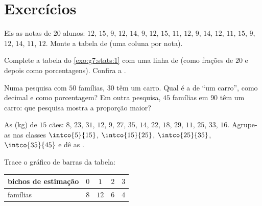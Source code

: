 \section{Exercícios}

\begin{exercise}[$\star$]\label{exo:g7:stats:1}
Eis as notas de $20$ alunos: $12$, $15$, $9$, $12$, $14$, $9$, $12$,
$15$, $11$, $12$, $9$, $14$, $12$, $11$, $15$, $9$, $12$, $14$, $11$,
$12$. Monte a tabela de  (uma coluna por nota).
\end{exercise}

\begin{exercise}[$\star$]\label{exo:g7:stats:2}
Complete a tabela do \cref{exo:g7:stats:1} com uma linha de
 (como frações de $20$ e depois como
porcentagens). Confira a .
\end{exercise}

\begin{exercise}[$\star$]\label{exo:g7:stats:3}
Numa pesquisa com $50$ famílias, $30$ têm um carro. Qual é a
 de ``um carro'', como decimal e como porcentagem?
Em outra pesquisa, $45$ famílias em $90$ têm um carro: que pesquisa
mostra a proporção maior?
\end{exercise}

\begin{exercise}[$\star$]\label{exo:g7:stats:4}
As  (kg) de $15$ cães: $8$, $23$, $31$, $12$, $9$, $27$, $35$,
$14$, $22$, $18$, $29$, $11$, $25$, $33$, $16$. Agrupe-as nas classes
$\intco{5}{15}$, $\intco{15}{25}$, $\intco{25}{35}$,
$\intco{35}{45}$ e dê as .
\end{exercise}

\begin{exercise}[$\star$]\label{exo:g7:stats:5}
Trace o gráfico de barras da tabela:
\begin{center}
\renewcommand{\arraystretch}{1.2}
\begin{tabular}{l|cccc}
bichos de estimação & $0$ & $1$ & $2$ & $3$ \\
\hline
famílias & $8$ & $12$ & $6$ & $4$ \\
\end{tabular}
\end{center}
\end{exercise}

